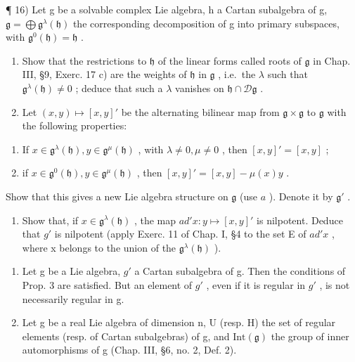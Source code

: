 ¶ 16) Let g be a solvable complex Lie algebra, h a Cartan subalgebra of g, \(\mathfrak{g} = \bigoplus \mathfrak{g}^{\lambda}(\mathfrak{h})\) the corresponding decomposition of g into primary subspaces, with \(\mathfrak{g}^{0}(\mathfrak{h}) = \mathfrak{h}\) .

\begin{enumerate}
\def\labelenumi{\alph{enumi})}
\item
  Show that the restrictions to \(\mathfrak{h}\) of the linear forms called roots of \(\mathfrak{g}\) in Chap. III, §9, Exerc. 17 c) are the weights of \(\mathfrak{h}\) in \(\mathfrak{g}\) , i.e.~the \(\lambda\) such that \(\mathfrak{g}^{\lambda}(\mathfrak{h}) \neq 0\) ; deduce that such a \(\lambda\) vanishes on \(\mathfrak{h} \cap \mathcal{D}\mathfrak{g}\) .
\item
  Let \((x,y)\mapsto [x,y]'\) be the alternating bilinear map from \(\mathfrak{g}\times \mathfrak{g}\) to \(\mathfrak{g}\) with the following properties:
\end{enumerate}

\begin{enumerate}
\def\labelenumi{(\roman{enumi})}
\item
  If \(x \in \mathfrak{g}^{\lambda}(\mathfrak{h}), y \in \mathfrak{g}^{\mu}(\mathfrak{h})\) , with \(\lambda \neq 0, \mu \neq 0\) , then \([x, y]' = [x, y]\) ;
\item
  if \(x \in \mathfrak{g}^{0}(\mathfrak{h}), y \in \mathfrak{g}^{\mu}(\mathfrak{h})\) , then \([x, y]' = [x, y] - \mu(x)y\) .
\end{enumerate}

Show that this gives a new Lie algebra structure on \(\mathfrak{g}\) (use \(a\) ). Denote it by \(\mathfrak{g}'\) .

\begin{enumerate}
\def\labelenumi{\alph{enumi})}
\setcounter{enumi}{2}
\tightlist
\item
  Show that, if \(x \in \mathfrak{g}^{\lambda}(\mathfrak{h})\) , the map \(ad'x : y \mapsto [x, y]'\) is nilpotent. Deduce that \(g'\) is nilpotent (apply Exerc. 11 of Chap. I, §4 to the set E of \(ad'x\) , where x belongs to the union of the \(\mathfrak{g}^{\lambda}(\mathfrak{h})\) ).
\end{enumerate}


\begin{enumerate}
\def\labelenumi{\arabic{enumi})}
\item
  Let g be a Lie algebra, \(g'\) a Cartan subalgebra of g. Then the conditions of Prop. 3 are satisfied. But an element of \(g'\) , even if it is regular in \(g'\) , is not necessarily regular in g.
\item
  Let g be a real Lie algebra of dimension n, U (resp. H) the set of regular elements (resp. of Cartan subalgebras) of g, and \(\text{Int}(\mathfrak{g})\) the group of inner automorphisms of g (Chap. III, §6, no. 2, Def. 2).
\end{enumerate}

